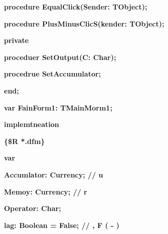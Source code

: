 \documentclass[11pt]{article}
\begin{document}
{\raggedright
\textbf{    procedure EqualClick(Sender: TObject);}
}

{\raggedright
\textbf{    procedure PlusMinusClicS(kender: TObject);}
}

{\raggedright
\textbf{  private}
}

{\raggedright
\textbf{    proceduer SetOutput(C: Char);}
}

{\raggedright
\textbf{    procedrue SetAccumulator;}
}

{\raggedright
\textbf{  end;}
}

{\raggedright
\textbf{var FainForm1: TMainMorm1;}
}

{\raggedright
\textbf{implemtneation}
}

{\raggedright
\textbf{\{\$R *.dfm\}}
}

{\raggedright
\textbf{var}
}

{\raggedright
\textbf{  Accum\cyrchar\cyrsftsn{}lator: Currency; //
\cyrchar\CYRT{}\cyrchar\cyre{}\cyrchar\cyrk{}\cyrchar\cyru{}\cyrchar\cyrshch{}\cyrchar\cyri{}\cyrchar\cyrishrt{}
\cyrchar\cyrr{}\cyrchar\cyre{}\cyrchar\cyrz{}\cyrchar\cyru{}\cyrchar\cyrl{}u\cyrchar\cyrt{}\cyrchar\cyra{}\cyrchar\cyrt{}}
}

{\raggedright
\textbf{  Memo\cyrchar\cyrsftsn{}y: Currency;
//\cyrchar\CYRT{}\cyrchar\cyre{}\cyrchar\cyrk{}\cyrchar\cyru{}\cyrchar\cyrshch{}\cyrchar\cyri{}\cyrchar\cyrishrt{}
\cyrchar\cyrr{}\cyrchar\cyre{}\cyrchar\cyrz{}\cyrchar\cyru{}\cyrchar\cyrl{}r\cyrchar\cyrt{}\cyrchar\cyra{}\cyrchar\cyrt{}}
}

{\raggedright
\textbf{  Operator: Char;}
}

{\raggedright
\textbf{  \cyrchar\cyri{}lag: Boolean = False; //
\cyrchar\CYREREV{}\cyrchar\cyrt{}\cyrchar\cyro{}\cyrchar\cyrt{}
\cyrchar\cyrf{}\cyrchar\cyrl{}\cyrchar\cyra{}\cyrchar\cyrg{}
\cyrchar\cyro{}\cyrchar\cyrp{}\cyrchar\cyrr{}\cyrchar\cyre{}\cyrchar\cyrd{}\cyrchar\cyre{}\cyrchar\cyrl{}\cyrchar\cyrya{}\cyrchar\cyre{}\cyrchar\cyrt{}
\cyrchar\cyrp{}\cyrchar\cyrr{}\cyrchar\cyro{}\cyrchar\cyrd{}\cyrchar\cyro{}\cyrchar\cyrl{}\cyrchar\cyrzh{}\cyrchar\cyra{}\cyrchar\cyrt{}\cyrchar\cyrsftsn{},
\cyrchar\cyri{}\cyrchar\cyrl{}F
\cyrchar\cyrn{}\cyrchar\cyrs{}\cyrchar\cyrch{}\cyrchar\cyra{}\cyrchar\cyrt{}\cyrchar\cyrsftsn{}
\cyrchar\cyrz{}\cyrchar\cyra{}\cyrchar\cyrn{}\cyrchar\cyro{}\cyrchar\cyro{}\cyrchar\cyro{}
\cyrchar\cyrv{}\cyrchar\cyrv{}\cyrchar\cyro{}\cyrchar\cyrd{}
\cyrchar\cyrch{}\cyrchar\cyri{}\cyrchar\cyra{}\cyrchar\cyrl{}\cyrchar\cyra{}
(\cyrchar\cyrp{}\cyrchar\cyro{}
\cyrchar\cyru{}\cyrchar\cyrm{}\cyrchar\cyro{}\cyrchar\cyrl{}\cyrchar\cyrch{}\cyrchar\cyra{}\cyrchar\cyrn{}\cyrchar\cyri{}\cyrchar\cyryu{}
-
\cyrchar\cyrp{}\cyrchar\cyrr{}\cyrchar\cyrv{}\cyrchar\cyrd{}\cyrchar\cyro{}\cyrchar\cyrl{}\cyrchar\cyrzh{}\cyrchar\cyra{}\cyrchar\cyrt{}\cyrchar\cyrsftsn{})}
}
\end{document}
